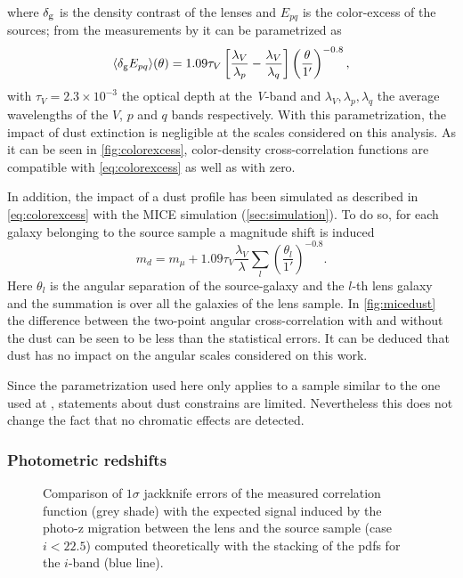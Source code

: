 where $\delta_{\rm g}$ is the density contrast of the lenses and $E_{pq}$ is the color-excess of the sources; from the measurements by \cite{2010MNRAS.405.1025M} it can be parametrized as
\begin{equation}
\langle\delta_{\rm g}E_{pq}\rangle(\theta) = 1.09\tau_V\left[\frac{\lambda_V}{\lambda_p}-\frac{\lambda_V}{\lambda_q}\right]\left(\frac{\theta}{1'}\right)^{-0.8},
\label{eq:colorexcess}
\end{equation}
with $\tau_V=2.3\times10^{-3}$ the optical depth at the {\it V}-band  and $\lambda_V,\lambda_p,\lambda_q$ the average wavelengths of the $V$, $p$ and $q$ bands respectively. With this parametrization, the impact of dust extinction is negligible at the scales considered on this analysis. As it can be seen in \autoref{fig:colorexcess}, color-density cross-correlation functions are compatible with \autoref{eq:colorexcess} as well as with zero.
\newline

In addition, the impact of a dust profile has been simulated as described in \autoref{eq:colorexcess} with the MICE simulation (\autoref{sec:simulation}). To do so, for each galaxy belonging to the source sample a magnitude shift is induced
\begin{equation}
m_d = m_\mu +1.09\tau_V\frac{\lambda_V}{\lambda}\sum\limits_{l}\left(\frac{\theta_l}{1'}\right)^{-0.8}.
\end{equation}
Here $\theta_l$ is the angular separation of the source-galaxy and the $l$-th lens galaxy and the summation is over all the galaxies of the lens sample. In \autoref{fig:micedust} the difference between the two-point angular cross-correlation with and without the dust can be seen to be less than the statistical errors. It can be deduced that dust has no impact on the angular scales considered on this work.
\newline

Since the parametrization used here only applies to a sample similar to the one used at \cite{2010MNRAS.405.1025M}, statements about dust constrains are limited. Nevertheless this does not change the fact that no chromatic effects are detected.

\subsubsection{Photometric redshifts}

\begin{figure}
\caption{Comparison of $1\sigma$ jackknife errors of the measured correlation function (grey shade) with the expected signal induced by the photo-z migration between the lens and the source sample (case $i<22.5$) computed theoretically with the stacking of the pdfs for the $i$-band (blue line).}
\label{fig:theophotoz}
\end{figure}

